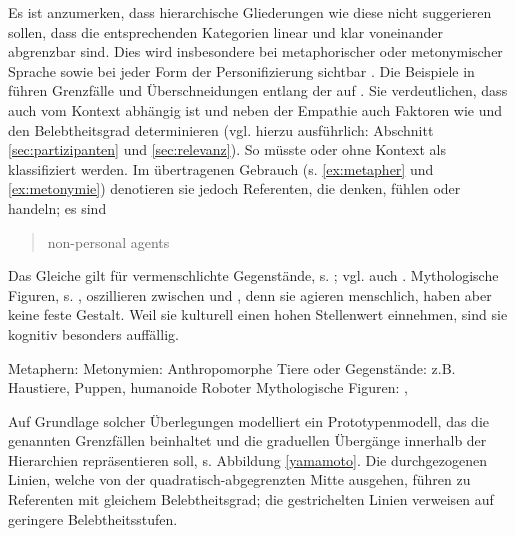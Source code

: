 Es ist anzumerken, dass hierarchische Gliederungen wie diese nicht suggerieren sollen, dass die entsprechenden Kategorien linear und klar voneinander abgrenzbar sind. Dies wird  insbesondere bei metaphorischer  oder metonymischer  Sprache sowie bei jeder Form der Personifizierung sichtbar \parencite[vgl.][62]{Dahl1996}. Die Beispiele in  führen Grenzfälle und Überschneidungen entlang der   auf \parencites()()[basierend auf][62--63]{Dahl1996}[18--20]{Yamamoto1999}. Sie verdeutlichen, dass  auch vom Kontext abhängig ist und neben der Empathie auch Faktoren wie  und  den Belebtheitsgrad  determinieren (vgl. hierzu ausführlich: Abschnitt \ref{sec:partizipanten} und \ref{sec:relevanz}).
So müsste  oder  ohne Kontext als  klassifiziert werden. Im übertragenen Gebrauch (s. \ref{ex:metapher} und \ref{ex:metonymie}) denotieren sie jedoch  Referenten, die denken, fühlen oder handeln; es sind \blockcquote[62]{Dahl1996}{non-personal agents}. Das Gleiche gilt für vermenschlichte Gegenstände, s. ; vgl. auch \textcite[][]{Epley2007}. Mythologische Figuren, s. , oszillieren zwischen  und , denn sie agieren menschlich, haben aber keine feste Gestalt. Weil sie kulturell einen hohen Stellenwert  einnehmen, sind sie kognitiv besonders auffällig. 
  
\begin{exe}
	\ex \label{ex:borderlines}
	\begin{xlist}
		\ex \label{ex:metapher} Metaphern: 
 		\ex \label{ex:metonymie} Metonymien: 
		\ex \label{ex:anthropo} Anthropomorphe Tiere oder Gegenstände: z.B. Haustiere, Puppen, humanoide Roboter	
		\ex \label{ex:mytho} Mythologische Figuren: , 
	\end{xlist}
\end{exe}
\noindent
Auf Grundlage solcher Überlegungen modelliert \textcite{Yamamoto1999} ein Prototypenmodell, das die genannten Grenzfällen beinhaltet und die graduellen Übergänge innerhalb der Hierarchien  repräsentieren soll, s. Abbildung \ref{yamamoto}. Die durchgezogenen Linien, welche von der quadratisch-abgegrenzten Mitte ausgehen, führen zu Referenten mit gleichem  Belebtheitsgrad; die gestrichelten Linien verweisen auf geringere  Belebtheitsstufen.

